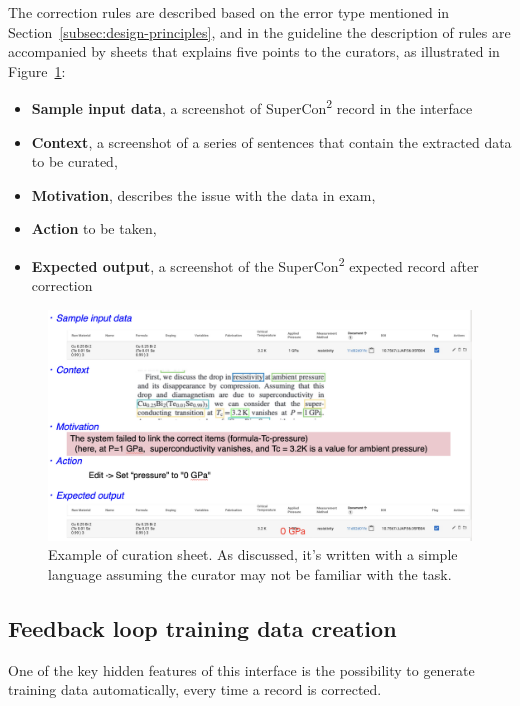 \documentclass[a4paper]{article}
\begin{document}
The correction rules are described based on the error type mentioned in Section~\ref{subsec:design-principles}, and in the guideline the description of rules are accompanied by sheets that explains five points to the curators, as illustrated in Figure~\ref{fig:example-curation-sheet}:
\begin{itemize}
    \item \textbf{Sample input data}, a screenshot of SuperCon\textsuperscript{2} record in the interface
    \item \textbf{Context}, a screenshot of a series of sentences that contain the extracted data to be curated,
    \item \textbf{Motivation}, describes the issue with the data in exam, 
    \item \textbf{Action} to be taken, 
    \item \textbf{Expected output}, a screenshot of the SuperCon\textsuperscript{2} expected record after correction
\end{itemize}


\begin{figure}[ht]
  \centering
  \includegraphics[width=1\textwidth]{images/example-sheet-curation.png} 
  \caption{Example of curation sheet. As discussed, it's written with a simple language assuming the curator may not be familiar with the task. }
  \label{fig:example-curation-sheet}
\end{figure}

\subsection{Feedback loop training data creation}
\label{subsec:feedback-loop-training-data}
One of the key hidden features of this interface is the possibility to generate training data automatically, every time a record is corrected. 
\end{document}
